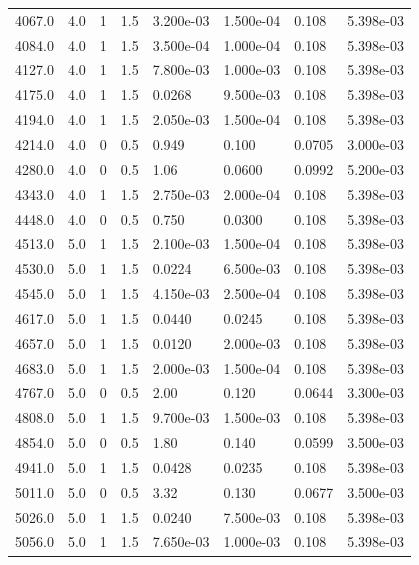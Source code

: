 \documentclass[preview]{standalone}
\begin{document}
{{{\begin{tabular}{L{1.2cm}C{1.2cm} C{0.3cm}C{0.5cm} C{1.4cm}C{1.4cm} C{1.4cm}C{1.4cm}}
  4067.0  &   4.0  & 1     & 1.5 &  3.200e-03  & 1.500e-04  & 0.108 &  5.398e-03   \\ 
  4084.0  &   4.0  & 1     & 1.5 &  3.500e-04  & 1.000e-04  & 0.108 &  5.398e-03   \\ 
  4127.0  &   4.0  & 1     & 1.5 &  7.800e-03  & 1.000e-03  & 0.108 &  5.398e-03   \\ 
  4175.0  &   4.0  & 1     & 1.5 &  0.0268  & 9.500e-03  & 0.108 &  5.398e-03   \\ 
  4194.0  &   4.0  & 1     & 1.5 &  2.050e-03  & 1.500e-04  & 0.108 &  5.398e-03   \\ 
  4214.0  &   4.0  & 0     & 0.5 &  0.949  & 0.100  & 0.0705 &  3.000e-03   \\ 
  4280.0  &   4.0  & 0     & 0.5 &  1.06  & 0.0600  & 0.0992 &  5.200e-03   \\ 
  4343.0  &   4.0  & 1     & 1.5 &  2.750e-03  & 2.000e-04  & 0.108 &  5.398e-03   \\ 
  4448.0  &   4.0  & 0     & 0.5 &  0.750  & 0.0300  & 0.108 &  5.398e-03   \\ 
  4513.0  &   5.0  & 1     & 1.5 &  2.100e-03  & 1.500e-04  & 0.108 &  5.398e-03   \\ 
  4530.0  &   5.0  & 1     & 1.5 &  0.0224  & 6.500e-03  & 0.108 &  5.398e-03   \\ 
  4545.0  &   5.0  & 1     & 1.5 &  4.150e-03  & 2.500e-04  & 0.108 &  5.398e-03   \\ 
  4617.0  &   5.0  & 1     & 1.5 &  0.0440  & 0.0245  & 0.108 &  5.398e-03   \\ 
  4657.0  &   5.0  & 1     & 1.5 &  0.0120  & 2.000e-03  & 0.108 &  5.398e-03   \\ 
  4683.0  &   5.0  & 1     & 1.5 &  2.000e-03  & 1.500e-04  & 0.108 &  5.398e-03   \\ 
  4767.0  &   5.0  & 0     & 0.5 &  2.00  & 0.120  & 0.0644 &  3.300e-03   \\ 
  4808.0  &   5.0  & 1     & 1.5 &  9.700e-03  & 1.500e-03  & 0.108 &  5.398e-03   \\ 
  4854.0  &   5.0  & 0     & 0.5 &  1.80  & 0.140  & 0.0599 &  3.500e-03   \\ 
  4941.0  &   5.0  & 1     & 1.5 &  0.0428  & 0.0235  & 0.108 &  5.398e-03   \\ 
  5011.0  &   5.0  & 0     & 0.5 &  3.32  & 0.130  & 0.0677 &  3.500e-03   \\ 
  5026.0  &   5.0  & 1     & 1.5 &  0.0240  & 7.500e-03  & 0.108 &  5.398e-03   \\ 
  5056.0  &   5.0  & 1     & 1.5 &  7.650e-03  & 1.000e-03  & 0.108 &  5.398e-03   \\ 

\end{tabular}}}}
\end{document}
